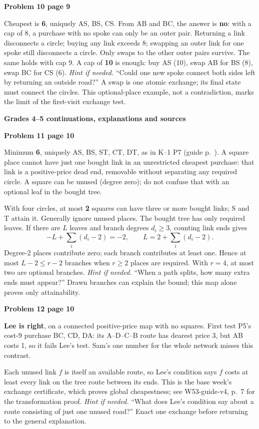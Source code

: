 \documentclass[11pt]{article}
\newcommand{\head}[1]{\par{\large\bfseries #1}\par\nobreak}
\newcommand{\sub}[1]{\par\textbf{#1}\par\nobreak}
\newcommand{\hint}[1]{\textit{Hint if needed.} #1}
\begin{document}
\sub{Problem 10 page 9}
Cheapest is \textbf{6}, uniquely AS, BS, CS. From AB and BC, the answer is \textbf{no}: with a cap of 8, a purchase with no spoke can only be an outer pair. Returning a link disconnects a circle; buying any link exceeds 8; swapping an outer link for one spoke still disconnects a circle. Only swaps to the other outer pairs survive. The same holds with cap 9. A cap of \textbf{10} is enough: buy AS (10), swap AB for BS (8), swap BC for CS (6). \hint{``Could one new spoke connect both sides left by returning an outside road?''} A swap is one atomic exchange; its final state must connect the circles. This optional-place example, not a contradiction, marks the limit of the first-visit exchange test.
\newpage
\head{Grades 4--5 continuations, explanations and sources}
\sub{Problem 11 page 10}\label{leaf}
Minimum \textbf{6}, uniquely AS, BS, ST, CT, DT, as in K--1 P7 (guide p.~\pageref{two-squares}). A square place cannot have just one bought link in an unrestricted cheapest purchase: that link is a positive-price dead end, removable without separating any required circle. A square can be unused (degree zero); do not confuse that with an optional leaf in the bought tree.

With four circles, at most \textbf{2} squares can have three or more bought links; S and T attain it. Generally ignore unused places. The bought tree has only required leaves. If there are $L$ leaves and branch degrees $d_i\ge3$, counting link ends gives
\[
-L+\sum_i(d_i-2)=-2,\qquad L=2+\sum_i(d_i-2).
\]
Degree-2 places contribute zero; each branch contributes at least one. Hence at most $L-2\le r-2$ branches when $r\ge2$ places are required. With $r=4$, at most two are optional branches. \hint{``When a path splits, how many extra ends must appear?''} Drawn branches can explain the bound; this map alone proves only attainability.

\sub{Problem 12 page 10}
\textbf{Lee is right}, on a connected positive-price map with no squares. First test P5's cost-9 purchase BC, CD, DA: its A--D--C--B route has dearest price 3, but AB costs 1, so it fails Lee's test. Sam's one number for the whole network misses this contrast.

Each unused link $f$ is itself an available route, so Lee's condition says $f$ costs at least every link on the tree route between its ends. This is the base week's exchange certificate, which proves global cheapestness; see W53-guide-v4, p.~7 for the transformation proof. \hint{``What does Lee's condition say about a route consisting of just one unused road?''} Enact one exchange before returning to the general explanation.
\end{document}
